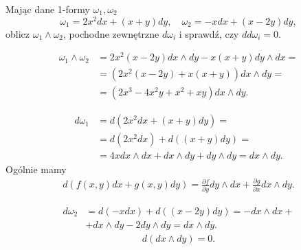 \documentclass[../main.tex]{subfiles}
\begin{document}
\begin{cw}
    Mając dane 1-formy $\omega_1, \omega_2$
    \[
        \omega_1 = 2x^2dx + (x+y)dy,\quad \omega_2 = -xdx + (x-2y)dy
    ,\]
oblicz $\omega_1 \land \omega_2$, pochodne zewnętrzne $d\omega_i$ i sprawdź, czy $dd\omega_i = 0$.
\end{cw}
\begin{align*}
    \omega_1 \land \omega_2 &= 2x^2(x-2y)dx\land dy - x(x+y)dy\land dx = \\
    &= \left( 2x^2(x-2y) + x(x+y) \right) dx\land dy =\\
    &= \left( 2x^3 - 4x^2y + x^2 + xy\right) dx\land dy
.\end{align*}

\begin{align*}
    d\omega_1 &= d\left( 2x^2dx + (x+y)dy \right) =\\
    &= d(2x^2dx) + d\left( (x+y)dy\right) =\\
    &= 4xdx\land dx + dx\land dy + dy\land dy = dx\land dy
.\end{align*}
Ogólnie mamy
\begin{align*}
    d\left(f(x,y)dx + g(x,y)dy\right) = \frac{\partial f}{\partial y} dy\land dx + \frac{\partial g}{\partial x} dx\land dy
.\end{align*}

\begin{align*}
    d\omega_2 &= d(-xdx) + d\left( (x-2y) dy \right) = - dx\land dx +\\
    &+ dx\land dy - 2dy\land dy = dx\land dy
.\end{align*}
\begin{align*}
    d\left(dx\land dy\right) = 0
.\end{align*}
\end{document}
